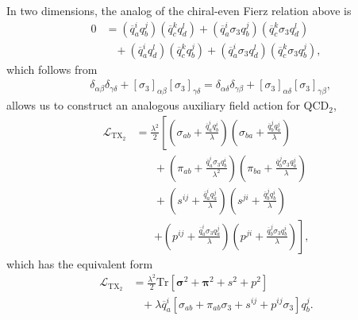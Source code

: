 \documentclass[%
    twocolumn,
superscriptaddress,
preprintnumbers,
nofootinbib,
 amsmath,amssymb,
 aps,
 prd,
 floatfix,
]{revtex4-2}
\newcommand{\tx}[0]{\text{TX}}
\begin{document}
In two dimensions, the analog of the chiral-even Fierz relation above is 
\begin{equation}
\begin{split}
    0 &= (\overline{q}^i_a q^j_b)(\overline{q}^k_c  q^l_d) + (\overline{q}^i_a  \sigma_3 q^j_b)(\overline{q}^k_c  \sigma_3 q^l_d)  \\
    &\hspace{10pt} + (\overline{q}^i_a q^l_d)(\overline{q}^k_c q^j_b) + (\overline{q}^i_a \sigma_3 q^l_d)(\overline{q}^k_c \sigma_3 q^j_b) ,
    \end{split}
\end{equation}
which follows from
\begin{equation}
\begin{split}
    &\delta_{
    \alpha\beta} \delta_{\gamma\delta} + [\sigma_3]_{\alpha\beta}[\sigma_3]_{\gamma\delta} = \delta_{\alpha\delta} \delta_{\gamma\beta} +  [\sigma_3]_{\alpha\delta}[\sigma_3]_{\gamma\beta},
    \end{split}
\end{equation}
allows us to construct an analogous auxiliary field action for QCD$_2$,
\begin{equation}\label{eq:LTX2}
\begin{split}
   \mathcal{L}_{\tx_2} &= \frac{\lambda^2}{2} \left[ \left(\sigma_{ab} + \frac{ \overline{q}^i_a q^i_b }{\lambda} \right)\left(\sigma_{ba} + \frac{ \overline{q}^j_b q^j_a }{\lambda} \right) \right. \\
   &\hspace{20pt} + \left(\pi_{ab} + \frac{ \overline{q}^i_a \sigma_3 q^i_b }{\lambda^2} \right)\left(\pi_{ba} + \frac{ \overline{q}^j_b \sigma_3 q^j_a }{ \lambda} \right) \\
   &\hspace{20pt} + \left(s^{ij} + \frac{ \overline{q}^i_a q^j_a }{\lambda} \right)\left(s^{ji} + \frac{ \overline{q}^j_b q^i_b }{\lambda} \right) \\
    &\hspace{20pt} \left. + \left(p^{ij} + \frac{ \overline{q}^i_a \sigma_3 q^j_a }{\lambda} \right)\left(p^{ji} + \frac{ \overline{q}^j_b \sigma_3 q^i_b }{\lambda} \right) \right],
   \end{split}
\end{equation}
which has the equivalent form
\begin{equation}
\begin{split}
    \mathcal{L}_{\tx_2}  &= \frac{\lambda^2}{2}\text{Tr}
    [\bm{\sigma}^2 + \bm{\pi}^2 + s^2 + p^2] \\
    & \hspace{10pt} + \lambda \overline{q}^i_a\left[ \sigma_{ab} + \pi_{ab}\sigma_3 + s^{ij} + p^{ij}  \sigma_3   \right]q^j_b.
   \end{split}
\end{equation}
\end{document}
